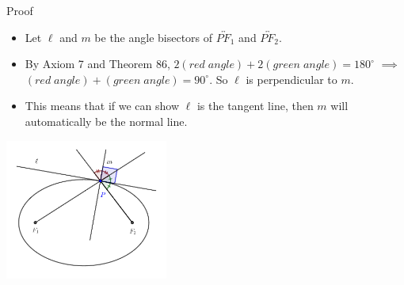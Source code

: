 \documentclass[compress,aspectratio=169,10pt,usenames,dvipsnames]{beamer}
\begin{document}
\begin{frame}

\vfill

\begin{block}{Proof}
\begin{itemize}
\item Let $\ell$ and $m$ be the angle bisectors of $\overleftrightarrow{PF_1}$ and $\overleftrightarrow{PF_2}$. 
\item By Axiom 7 and Theorem 86, $2(red\; angle) + 2(green \; angle) = 180^\circ$ $\implies$ $(red\; angle) + (green\; angle) = 90^\circ$. So $\ell$ is perpendicular to $m$.
\item This means that if we can show $\ell$ is the tangent line, then $m$ will automatically be the normal line.  
\end{itemize}
\end{block}

\begin{center}
\includegraphics[width=0.4\textwidth]{EllipseProp1A}
\end{center}

\vfill

\end{frame}

\end{document}
